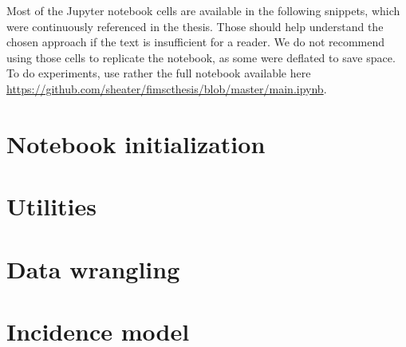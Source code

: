 \documentclass[
  digital, %
  oneside, %
  lof,     %
  lot,     %
]{fithesis4}
\begin{document}
Most of the Jupyter notebook cells are available in the following snippets, which were continuously referenced in the thesis.
Those should help understand the chosen approach if the text is insufficient for a reader.
We do not recommend using those cells to replicate the notebook, as some were deflated to save space.
To do experiments, use rather the full notebook available here \url{https://github.com/sheater/fimscthesis/blob/master/main.ipynb}.


\section{Notebook initialization}




\section{Utilities}









% 


\section{Data wrangling}














\section{Incidence model}
\end{document}
